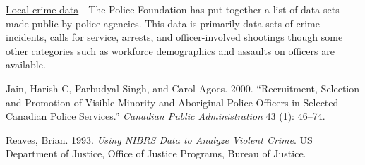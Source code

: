 \documentclass[
  12pt,
]{book}
\newlength{\cslhangindent}
\newenvironment{cslreferences}%
  {\setlength{\parindent}{0pt}%
  \everypar{\setlength{\hangindent}{\cslhangindent}}\ignorespaces}%
  {\par}
\begin{document}
\href{https://www.policedatainitiative.org/datasets/}{Local crime data} - The Police Foundation has put together a list of data sets made public by police agencies. This data is primarily data sets of crime incidents, calls for service, arrests, and officer-involved shootings though some other categories such as workforce demographics and assaults on officers are available.

\hypertarget{refs}{}
\begin{cslreferences}
\leavevmode\hypertarget{ref-jain2000recruitment}{}%
Jain, Harish C, Parbudyal Singh, and Carol Agocs. 2000. ``Recruitment, Selection and Promotion of Visible-Minority and Aboriginal Police Officers in Selected Canadian Police Services.'' \emph{Canadian Public Administration} 43 (1): 46--74.

\leavevmode\hypertarget{ref-reaves1993using}{}%
Reaves, Brian. 1993. \emph{Using NIBRS Data to Analyze Violent Crime}. US Department of Justice, Office of Justice Programs, Bureau of Justice.
\end{cslreferences}
\end{document}
